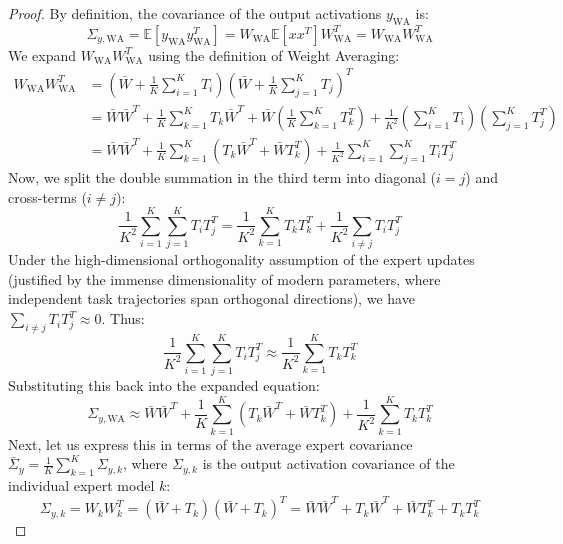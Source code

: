 \documentclass{article}
\theoremstyle{plain}
\theoremstyle{definition}
\theoremstyle{remark}
\begin{document}
\begin{proof}
By definition, the covariance of the output activations $y_{\text{WA}}$ is:
\begin{equation}
\Sigma_{y, \text{WA}} = \mathbb{E}[y_{\text{WA}} y_{\text{WA}}^T] = W_{\text{WA}} \mathbb{E}[x x^T] W_{\text{WA}}^T = W_{\text{WA}} W_{\text{WA}}^T
\end{equation}
We expand $W_{\text{WA}} W_{\text{WA}}^T$ using the definition of Weight Averaging:
\begin{align}
W_{\text{WA}} W_{\text{WA}}^T &= \left( \bar{W} + \frac{1}{K} \sum_{i=1}^K T_i \right) \left( \bar{W} + \frac{1}{K} \sum_{j=1}^K T_j \right)^T \\
&= \bar{W} \bar{W}^T + \frac{1}{K} \sum_{k=1}^K T_k \bar{W}^T + \bar{W} \left( \frac{1}{K} \sum_{k=1}^K T_k^T \right) + \frac{1}{K^2} \left( \sum_{i=1}^K T_i \right) \left( \sum_{j=1}^K T_j^T \right) \\
&= \bar{W} \bar{W}^T + \frac{1}{K} \sum_{k=1}^K \left( T_k \bar{W}^T + \bar{W} T_k^T \right) + \frac{1}{K^2} \sum_{i=1}^K \sum_{j=1}^K T_i T_j^T
\end{align}
Now, we split the double summation in the third term into diagonal ($i = j$) and cross-terms ($i \neq j$):
\begin{equation}
\frac{1}{K^2} \sum_{i=1}^K \sum_{j=1}^K T_i T_j^T = \frac{1}{K^2} \sum_{k=1}^K T_k T_k^T + \frac{1}{K^2} \sum_{i \neq j} T_i T_j^T
\end{equation}
Under the high-dimensional orthogonality assumption of the expert updates (justified by the immense dimensionality of modern parameters, where independent task trajectories span orthogonal directions), we have $\sum_{i \neq j} T_i T_j^T \approx 0$. Thus:
\begin{equation}
\frac{1}{K^2} \sum_{i=1}^K \sum_{j=1}^K T_i T_j^T \approx \frac{1}{K^2} \sum_{k=1}^K T_k T_k^T
\end{equation}
Substituting this back into the expanded equation:
\begin{equation}
\Sigma_{y, \text{WA}} \approx \bar{W} \bar{W}^T + \frac{1}{K} \sum_{k=1}^K \left( T_k \bar{W}^T + \bar{W} T_k^T \right) + \frac{1}{K^2} \sum_{k=1}^K T_k T_k^T
\end{equation}
Next, let us express this in terms of the average expert covariance $\bar{\Sigma}_y = \frac{1}{K} \sum_{k=1}^K \Sigma_{y, k}$, where $\Sigma_{y, k}$ is the output activation covariance of the individual expert model $k$:
\begin{equation}
\Sigma_{y, k} = W_k W_k^T = (\bar{W} + T_k)(\bar{W} + T_k)^T = \bar{W} \bar{W}^T + T_k \bar{W}^T + \bar{W} T_k^T + T_k T_k^T

\end{equation}
\end{proof}
\end{document}
